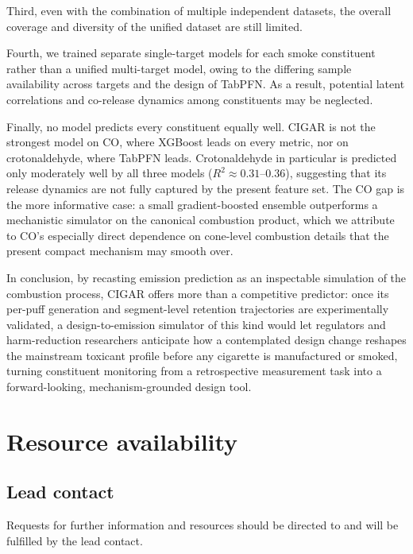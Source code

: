 \documentclass[11pt]{article}
\begin{document}
Third, even with the combination of multiple independent datasets, the overall coverage and diversity of the unified dataset are still limited.

Fourth, we trained separate single-target models for each smoke constituent rather than a unified multi-target model, owing to the differing sample availability across targets and the design of TabPFN. As a result, potential latent correlations and co-release dynamics among constituents may be neglected.

Finally, no model predicts every constituent equally well. CIGAR is not the strongest model on CO, where XGBoost leads on every metric, nor on crotonaldehyde, where TabPFN leads. Crotonaldehyde in particular is predicted only moderately well by all three models ($R^2 \approx 0.31$--$0.36$), suggesting that its release dynamics are not fully captured by the present feature set. The CO gap is the more informative case: a small gradient-boosted ensemble outperforms a mechanistic simulator on the canonical combustion product, which we attribute to CO's especially direct dependence on cone-level combustion details that the present compact mechanism may smooth over.

In conclusion, by recasting emission prediction as an inspectable simulation of the combustion process, CIGAR offers more than a competitive predictor: once its per-puff generation and segment-level retention trajectories are experimentally validated, a design-to-emission simulator of this kind would let regulators and harm-reduction researchers anticipate how a contemplated design change reshapes the mainstream toxicant profile before any cigarette is manufactured or smoked, turning constituent monitoring from a retrospective measurement task into a forward-looking, mechanism-grounded design tool.



\section*{Resource availability}

\subsection*{Lead contact}

Requests for further information and resources should be directed to and will be fulfilled by the lead contact.
\end{document}
